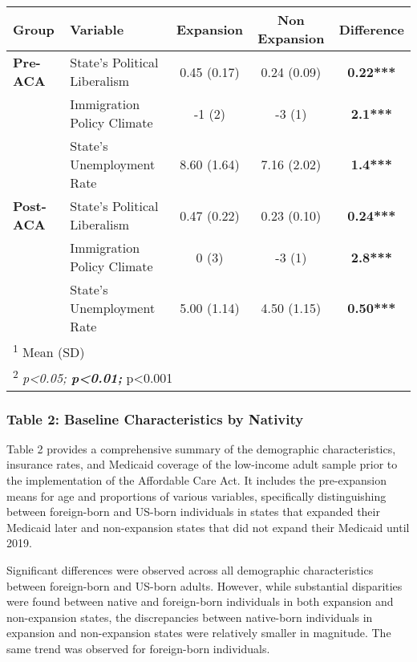 \documentclass[
]{article}
\let\origtable\table
\let\endorigtable\endtable
\renewenvironment{table}[1][ht]{
      \expandafter\origtable\expandafter[H]
    }{
      \endorigtable
    }
\begin{document}
\begin{table}[H]

\caption{\label{tab:tab1}Baseline Comparison of States}
\centering
\begin{tabular}[t]{>{}llccc}
\toprule
\textbf{Group} & \textbf{Variable} & \textbf{Expansion} & \textbf{Non Expansion} & \textbf{Difference}\\
\midrule
\textbf{Pre-ACA} & State's Political Liberalism & 0.45 (0.17) & 0.24 (0.09) & \textbf{0.22***}\\
\textbf{} & Immigration Policy Climate & -1 (2) & -3 (1) & \textbf{2.1***}\\
\textbf{} & State's Unemployment Rate & 8.60 (1.64) & 7.16 (2.02) & \textbf{1.4***}\\
\midrule
\textbf{Post-ACA} & State's Political Liberalism & 0.47 (0.22) & 0.23 (0.10) & \textbf{0.24***}\\
\textbf{} & Immigration Policy Climate & 0 (3) & -3 (1) & \textbf{2.8***}\\
\textbf{} & State's Unemployment Rate & 5.00 (1.14) & 4.50 (1.15) & \textbf{0.50***}\\
\bottomrule
\multicolumn{5}{l}{\rule{0pt}{1em}\textsuperscript{1} Mean (SD)}\\
\multicolumn{5}{l}{\rule{0pt}{1em}\textsuperscript{2} \textit{p<0.05; \textbf{p<0.01; }}p<0.001}\\
\end{tabular}
\end{table}

\hypertarget{table-2-baseline-characteristics-by-nativity}{%
\subsubsection{Table 2: Baseline Characteristics by
Nativity}\label{table-2-baseline-characteristics-by-nativity}}

Table 2 provides a comprehensive summary of the demographic
characteristics, insurance rates, and Medicaid coverage of the
low-income adult sample prior to the implementation of the Affordable
Care Act. It includes the pre-expansion means for age and proportions of
various variables, specifically distinguishing between foreign-born and
US-born individuals in states that expanded their Medicaid later and
non-expansion states that did not expand their Medicaid until 2019.

Significant differences were observed across all demographic
characteristics between foreign-born and US-born adults. However, while
substantial disparities were found between native and foreign-born
individuals in both expansion and non-expansion states, the
discrepancies between native-born individuals in expansion and
non-expansion states were relatively smaller in magnitude. The same
trend was observed for foreign-born individuals.
\end{document}
